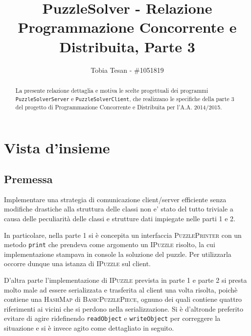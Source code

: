 \documentclass[a4paper]{article}
\title{PuzzleSolver - Relazione Programmazione Concorrente e Distribuita, Parte 3}
\author{Tobia Tesan - \#1051819}
\newcommand{\Classname}[1]{\textsc{#1}}
\newcommand{\Ifacename}[1]{\textsc{#1}}
\newcommand{\Methodname}[1]{\texttt{#1}}
\begin{document}
\maketitle

\begin{abstract}
La presente relazione dettaglia e motiva le scelte progettuali dei programmi \texttt{PuzzleSolverServer} e \texttt{PuzzleSolverClient}, che realizzano le specifiche della parte 3 del progetto di Programmazione Concorrente e Distribuita per l'A.A. 2014/2015.
\end{abstract}

\tableofcontents

\section{Vista d'insieme}
\subsection{Premessa}
Implementare una strategia di comunicazione client/server efficiente senza modifiche drastiche alla struttura delle classi non e' stato del tutto triviale a causa delle peculiarit\`a delle classi e strutture dati impiegate nelle parti 1 e 2.

In particolare, nella parte 1 si \`e concepita un interfaccia \Ifacename{PuzzlePrinter} con un metodo \Methodname{print} che prendeva come argomento un \Ifacename{IPuzzle} risolto, la cui implementazione stampava in console la soluzione del puzzle.
Per utilizzarla occorre dunque una istanza di \Ifacename{IPuzzle} sul client.

D'altra parte l'implementazione di \Ifacename{IPuzzle} prevista in parte 1 e parte 2 si presta molto male ad essere serializzata e trasferita al client una volta risolta, poich\`e contiene una \Classname{HashMap} di \Classname{BasicPuzzlePiece}, ognuno dei quali contiene quattro riferimenti ai vicini che si perdono nella serializzazione.
\label{intro}
Si \`e d'altronde preferito evitare di agire ridefinendo \Methodname{readObject} e \Methodname{writeObject} per correggere la situazione e si \`e invece agito come dettagliato in seguito.
\end{document}
